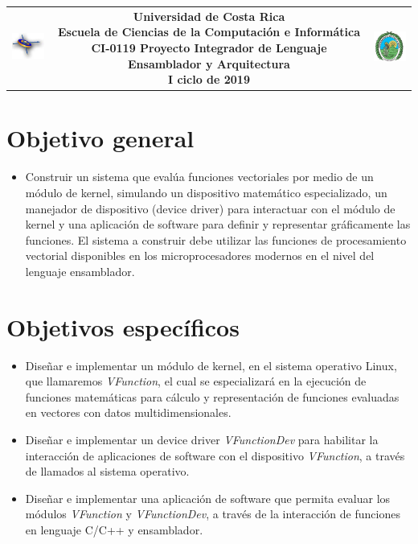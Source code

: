 \documentclass[12pt,letterpaper]{article}
\begin{document}
{\begin{tabular}{ccc}
  \includegraphics[width=15mm]{ECCI.jpg}& 
  \parbox{6in}{ \centering 
                  \small \textbf{Universidad de Costa Rica\\
                      Escuela de Ciencias de la Computación e Informática\\
                      CI-0119 Proyecto Integrador de Lenguaje Ensamblador y Arquitectura\\
                      I ciclo de 2019}\\
                     \hrulefill
                 }  & 
  \includegraphics[width=15mm]{UCR.jpg}\\
 \end{tabular}
}

{ }

\section*{Objetivo general}
\begin{itemize}
 \item Construir un sistema que evalúa funciones vectoriales por medio de un módulo de kernel, simulando un dispositivo matemático especializado, un manejador de dispositivo (device driver) para interactuar con el módulo de kernel y una aplicación de software para definir y representar gráficamente las funciones. El sistema a construir debe utilizar las funciones de procesamiento vectorial disponibles en los microprocesadores modernos en el nivel del lenguaje ensamblador.
\end{itemize}

\section*{Objetivos específicos}
\begin{itemize}
 \item Diseñar e implementar un módulo de kernel, en el sistema operativo Linux, que llamaremos \textit{VFunction}, el cual se especializará en la ejecución de funciones matemáticas para cálculo y representación de funciones evaluadas en vectores con datos multidimensionales.
 \item Diseñar e implementar un device driver \textit{VFunctionDev} para habilitar la interacción de aplicaciones de software con el dispositivo \textit{VFunction}, a través de llamados al sistema operativo.
 \item Diseñar e implementar una aplicación de software que permita evaluar los módulos \textit{VFunction} y \textit{VFunctionDev}, a través de la interacción de funciones en lenguaje C/C++ y ensamblador.
\end{itemize}
\end{document}
